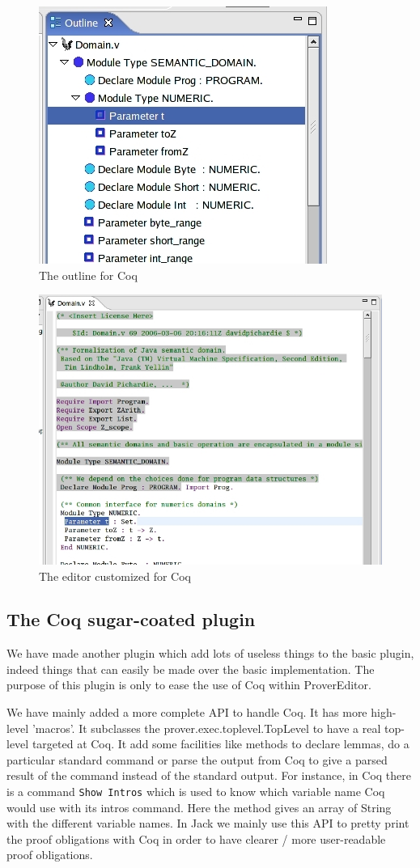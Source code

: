 \documentclass{entcs}
\begin{document}
\begin{figure}
\begin{center}
\includegraphics[width=0.5\linewidth]{coqoutline}
\end{center}
  \caption{The outline for Coq}
  \label{outline}
\end{figure}
\begin{figure}
\begin{center}
\includegraphics[width=0.6\linewidth]{coqeditor}
\end{center}
  \caption{The editor customized for Coq}
  \label{editor}
\end{figure}

\subsection{The Coq sugar-coated plugin}
\label{subsec:coq-sugar-coated}

We have made another plugin which add lots of useless things to the basic plugin,
indeed things that can easily be made over the basic implementation.
The purpose of this plugin is only to ease the use of Coq within ProverEditor.

We have mainly added a more complete API to handle Coq. It has more high-level
'macros'. It subclasses the prover.exec.toplevel.TopLevel to have a real top-level
targeted at Coq. It add some facilities like methods to declare lemmas, do a particular
standard command or parse the output from Coq to give a parsed result of the command
instead of the standard output. For instance, in Coq there is a command {\tt Show Intros} which
is used to know which variable name Coq would use with its  intros command. Here the
method gives an array of String with the different variable names.
In Jack we mainly use this API to pretty print the proof obligations with Coq in order
to have clearer / more user-readable proof obligations.
\end{document}
